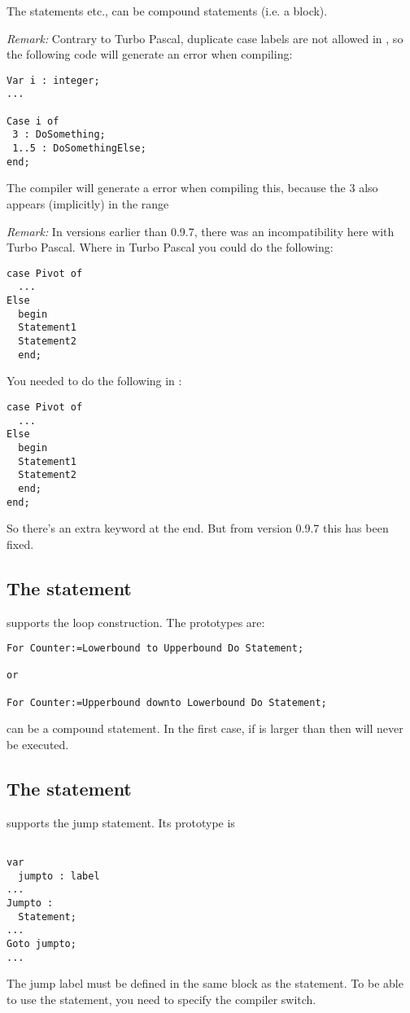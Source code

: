 \documentclass{report}
\begin{document}
The statements  etc., can be compound statements (i.e. a
 block).

{\em Remark:} Contrary to Turbo Pascal, duplicate case labels are not
allowed in \fpc, so the following code will generate an error when
compiling:

\begin{verbatim}
Var i : integer;
...

Case i of
 3 : DoSomething;
 1..5 : DoSomethingElse;
end;
\end{verbatim}
The compiler will generate a  error when compiling
this, because the 3 also appears (implicitly) in the range 

{\em Remark:} In versions earlier than 0.9.7, there was an incompatibility here 
with Turbo Pascal. Where in Turbo Pascal you could do the following:
\begin{verbatim}
case Pivot of
  ...
Else
  begin
  Statement1
  Statement2
  end;
\end{verbatim}
You needed to do the following in \fpc :
\begin{verbatim}
case Pivot of
  ...
Else
  begin
  Statement1
  Statement2
  end;
end;
\end{verbatim}
So there's an extra  keyword at the end. But from version 0.9.7
this has been fixed.
\subsection{The  statement}
\fpc supports the  loop construction. The prototypes are:
\begin{verbatim}
For Counter:=Lowerbound to Upperbound Do Statement;

or 

For Counter:=Upperbound downto Lowerbound Do Statement;
\end{verbatim}
 can be a compound statement. In the first case, if
 is larger than  then  will
never be executed.
\subsection{The  statement}
\fpc supports the  jump statement. Its prototype is
\begin{verbatim}

var
  jumpto : label
...
Jumpto : 
  Statement;
...
Goto jumpto;
...
\end{verbatim}
The jump label must be defined in the same block as the 
statement.
To be able to use the  statement, you need to specify the 
compiler switch.
\end{document}
